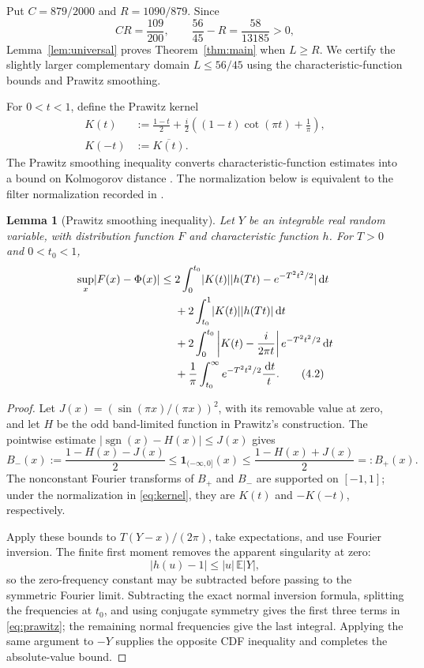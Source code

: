 \documentclass[11pt]{article}
\newtheorem{lemma}[theorem]{Lemma}
\newcommand{\E}{\mathbb E}
\newcommand{\dd}{\,\mathrm d}
\newcommand{\abs}[1]{\lvert#1\rvert}
\begin{document}
Put \(C=879/2000\) and \(R=1090/879\). Since
\[
 CR=\frac{109}{200},\qquad
 \frac{56}{45}-R=\frac{58}{13185}>0,
\]
Lemma~\ref{lem:universal} proves Theorem~\ref{thm:main} when \(L\ge R\).
We certify the slightly larger complementary domain \(L\le56/45\)
using the characteristic-function bounds and Prawitz smoothing.

For \(0<t<1\), define the Prawitz kernel
\[
 \begin{aligned}
 K(t)&:=\frac{1-t}{2}
 +\frac{i}{2}\left((1-t)\cot(\pi t)+\frac1\pi\right),\\
 K(-t)&:=\overline{K(t)}.
 \end{aligned}
 \label{eq:kernel}\tag{4.1}
\]
The Prawitz smoothing inequality converts characteristic-function estimates
into a bound on Kolmogorov distance \cite{prawitz1972}.
The normalization below is equivalent to the filter normalization recorded in
\cite[Section~2]{pinelis2013}.

\begin{lemma}[Prawitz smoothing inequality]\label{lem:prawitz}
Let \(Y\) be an integrable real random variable, with distribution function
\(F\) and characteristic function \(h\).
For \(T>0\) and \(0<t_0<1\),
\begin{align}
 \sup_x\abs{F(x)-\Phi(x)}
 \le{}&2\int_0^{t_0}\abs{K(t)}
       \abs{h(Tt)-e^{-T^2t^2/2}}\dd t \notag\\
 &+2\int_{t_0}^1\abs{K(t)}\abs{h(Tt)}\dd t \notag\\
 &+2\int_0^{t_0}\left|K(t)-\frac{i}{2\pi t}\right|
       e^{-T^2t^2/2}\dd t \notag\\
 &+\frac1\pi\int_{t_0}^{\infty}e^{-T^2t^2/2}\frac{\dd t}{t}.
 \label{eq:prawitz}\tag{4.2}
\end{align}
\end{lemma}

\begin{proof}
Let \(J(x)=(\sin(\pi x)/(\pi x))^2\), with its removable value at zero,
and let \(H\) be the odd band-limited function in Prawitz's construction.
The pointwise estimate
\(\abs{\operatorname{sgn}(x)-H(x)}\le J(x)\) gives
\[
 B_-(x):=\frac{1-H(x)-J(x)}2
 \le \mathbf 1_{(-\infty,0]}(x)
 \le \frac{1-H(x)+J(x)}2=:B_+(x).
\]
The nonconstant Fourier transforms of \(B_+\) and \(B_-\) are supported on
\([-1,1]\); under the normalization in \eqref{eq:kernel}, they are \(K(t)\)
and \(-K(-t)\), respectively.

Apply these bounds to \(T(Y-x)/(2\pi)\), take expectations, and use Fourier
inversion.  The finite first moment removes the apparent singularity at zero:
\[
 \abs{h(u)-1}\le \abs u\,\E\abs Y,
\]
so the zero-frequency constant may be subtracted before passing to the
symmetric Fourier limit.  Subtracting the exact normal inversion formula,
splitting the frequencies at \(t_0\), and using conjugate symmetry gives the
first three terms in \eqref{eq:prawitz}; the remaining normal frequencies give
the last integral.  Applying the same argument to \(-Y\) supplies the opposite
CDF inequality and completes the absolute-value bound.
\end{proof}
\end{document}

